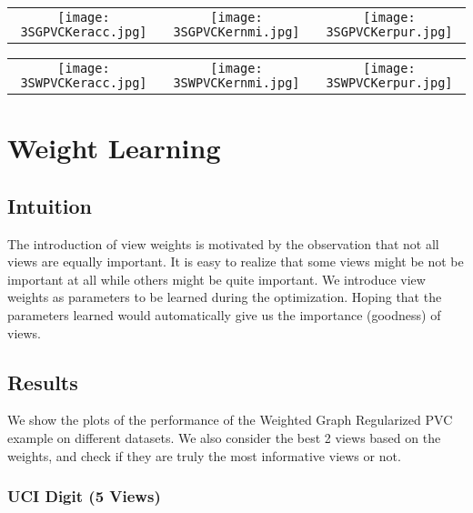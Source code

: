 \documentclass[a4paper]{article}
\begin{document}
	\begin{tabular}[H]{ccc}
		{\texttt{[image: 3SGPVCKeracc.jpg]}} 
    	& {\texttt{[image: 3SGPVCKernmi.jpg]}}
    	& {\texttt{[image: 3SGPVCKerpur.jpg]}}
	\end{tabular}
	\vspace{10mm}
	
	\begin{tabular}[H]{ccc}
		{\texttt{[image: 3SWPVCKeracc.jpg]}} 
    	& {\texttt{[image: 3SWPVCKernmi.jpg]}}
    	& {\texttt{[image: 3SWPVCKerpur.jpg]}}
	\end{tabular}
	\vspace{5mm}

	\restoregeometry	


	\section{Weight Learning}
	
	\subsection{Intuition}
		
	The introduction of view weights is motivated by the observation that not all views are equally important. It is easy to realize that some views might be not be important at all while others might be quite important. We introduce view weights as parameters to be learned during the optimization. Hoping that the parameters learned would automatically give us the importance (goodness) of views.

	\subsection{Results}

	We show the plots of the performance of the Weighted Graph Regularized PVC example on different datasets. We also consider the best 2 views based on the weights, and check if they are truly the most informative views or not.	
	
	\subsubsection{UCI Digit (5 Views)}
\end{document}

